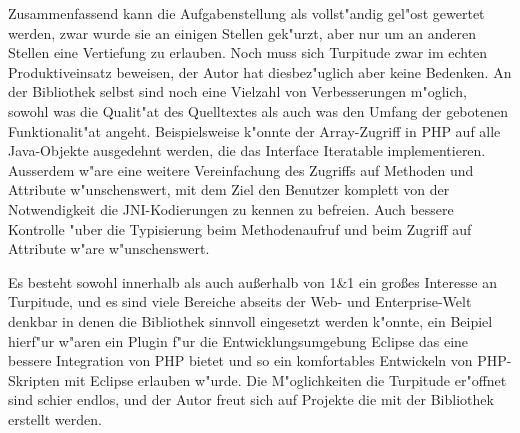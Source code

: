 Zusammenfassend kann die Aufgabenstellung als vollst"andig gel"ost gewertet werden, zwar wurde sie an einigen Stellen
gek"urzt, aber nur um an anderen Stellen eine Vertiefung zu erlauben.
Noch muss sich Turpitude zwar im echten Produktiveinsatz beweisen, der Autor hat diesbez"uglich aber keine Bedenken.
An der Bibliothek selbst sind noch eine Vielzahl von Verbesserungen m"oglich, sowohl was die Qualit"at des Quelltextes
als auch was den Umfang der gebotenen Funktionalit"at angeht. Beispielsweise k"onnte der Array-Zugriff in PHP auf alle
Java-Objekte ausgedehnt werden, die das Interface Iteratable implementieren. Ausserdem w"are eine weitere Vereinfachung
des Zugriffs auf Methoden und Attribute w"unschenswert, mit dem Ziel den Benutzer komplett von der Notwendigkeit die
JNI-Kodierungen zu kennen zu befreien. Auch bessere Kontrolle "uber die Typisierung beim Methodenaufruf und beim Zugriff
auf Attribute w"are w"unschenswert.

Es besteht sowohl innerhalb als auch au\ss erhalb von 1\&1 ein gro\ss es Interesse an Turpitude, und es sind viele Bereiche
abseits der Web- und Enterprise-Welt denkbar in denen die Bibliothek sinnvoll eingesetzt werden k"onnte, ein Beipiel hierf"ur
w"aren ein Plugin f"ur die Entwicklungsumgebung Eclipse das eine bessere Integration von PHP bietet und so ein komfortables
Entwickeln von PHP-Skripten mit Eclipse erlauben w"urde. Die M"oglichkeiten die Turpitude er"offnet sind schier endlos,
und der Autor freut sich auf Projekte die mit der Bibliothek erstellt werden.


